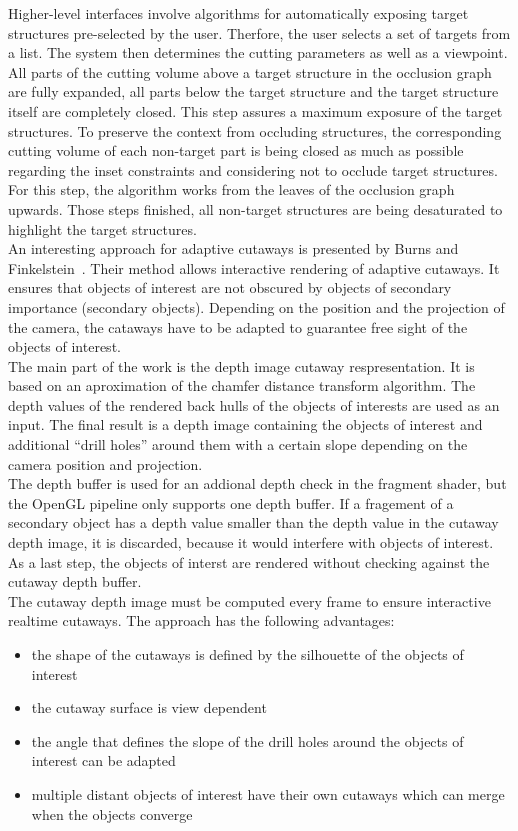Higher-level interfaces involve algorithms for automatically exposing target structures pre-selected by the user. Therfore, the user selects a set of targets from a list. The system then determines the cutting parameters as well as a viewpoint. All parts of the cutting volume above a target structure in the occlusion graph are fully expanded, all parts below the target structure and the target structure itself are completely closed. This step assures a maximum exposure of the target structures. To preserve the context from occluding structures, the corresponding cutting volume of each non-target part is being closed as much as possible regarding the inset constraints and considering not to occlude target structures. For this step, the algorithm works from the leaves of the occlusion graph upwards. Those steps finished, all non-target structures are being desaturated to highlight the target structures.\\
\newline
An interesting approach for adaptive cutaways is presented by Burns and Finkelstein~\cite{jour:adaptiveCutaways}. Their method allows interactive rendering of adaptive cutaways. It ensures that objects of interest are not obscured by objects of secondary importance (secondary objects). Depending on the position and the projection of the camera, the cataways have to be adapted to guarantee free sight of the objects of interest.\\
The main part of the work is the depth image cutaway respresentation. It is based on an aproximation of the chamfer distance transform algorithm. The depth values of the rendered back hulls of the objects of interests are used as an input. The final result is a depth image containing the objects of interest and additional "`drill holes"' around them with a certain slope depending on the camera position and projection.\\
The depth buffer is used for an addional depth check in the fragment shader, but the OpenGL pipeline only supports one depth buffer. If a fragement of a secondary object has a depth value smaller than the depth value in the cutaway depth image, it is discarded, because it would interfere with objects of interest. As a last step, the objects of interst are rendered without checking against the cutaway depth buffer.\\
The cutaway depth image must be computed every frame to ensure interactive realtime cutaways. The approach has the following advantages:
\begin{itemize}
	\item the shape of the cutaways is defined by the silhouette of the objects of interest
	\item the cutaway surface is view dependent
	\item the angle that defines the slope of the drill holes around the objects of interest can be adapted
	\item multiple distant objects of interest have their own cutaways which can merge when the objects converge
\end{itemize}
